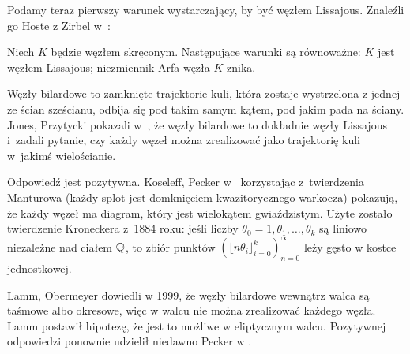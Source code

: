 Podamy teraz pierwszy warunek wystarczający, by być węzłem Lissajous.
Znaleźli go Hoste z Zirbel w~\cite{zirbel06}:

\begin{proposition}
%
%
    Niech $K$ będzie węzłem skręconym.
    Następujące warunki są równoważne: $K$ jest węzłem Lissajous; niezmiennik Arfa węzła $K$ znika.
\end{proposition}

Węzły bilardowe to zamknięte trajektorie kuli, która zostaje wystrzelona z jednej ze ścian sześcianu, odbija się pod takim samym kątem, pod jakim pada na ściany.
%
Jones, Przytycki pokazali w~\cite{jones98}, że węzły bilardowe to dokładnie węzły Lissajous i~zadali pytanie, czy każdy węzeł można zrealizować jako trajektorię kuli w~jakimś wielościanie.

Odpowiedź jest pozytywna.
Koseleff, Pecker w~\cite{koseleff14} korzystając z~twierdzenia Manturowa
%
(każdy splot jest domknięciem kwazitorycznego warkocza)
pokazują, że każdy węzeł ma diagram, który jest wielokątem gwiaździstym.
Użyte zostało twierdzenie Kroneckera z~1884 roku: jeśli liczby $\theta_0 = 1, \theta_1, \ldots, \theta_k$ są liniowo niezależne nad ciałem $\mathbb Q$, to zbiór punktów $(\lfloor n\theta_i \rfloor_{i=0}^k)_{n=0}^\infty$ leży gęsto w kostce jednostkowej.

Lamm, Obermeyer dowiedli w 1999, że węzły bilardowe wewnątrz walca są taśmowe albo okresowe, więc w walcu nie można zrealizować każdego węzła.
%
%
Lamm postawił hipotezę, że jest to możliwe w eliptycznym walcu.
Pozytywnej odpowiedzi ponownie udzielił niedawno Pecker w \cite{pecker12}.



